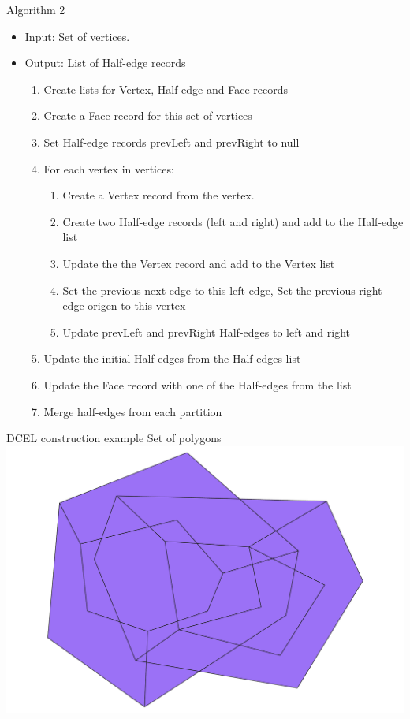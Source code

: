 \documentclass{beamer}
\begin{document}
\begin{frame}{Algorithm 2}
    \begin{itemize}
        \item Input: Set of vertices.
        \item Output: List of Half-edge records
        \begin{enumerate}
         \item Create lists for Vertex, Half-edge and Face records
         \item Create a Face record for this set of vertices
         \item Set Half-edge records prevLeft and prevRight to null 
         \item For each vertex in vertices:
            \begin{enumerate}
             \item Create a Vertex record from the vertex. 
             \item Create two Half-edge records (left and right) and add to the Half-edge list
             \item Update the the Vertex record and add to the Vertex list
             \item Set the previous next edge to this left edge, Set the previous right edge origen to this vertex
             \item Update prevLeft and prevRight Half-edges to left and right  
            \end{enumerate}
         \item Update the initial Half-edges from the Half-edges list
         \item Update the Face record with one of the Half-edges from the list
        \item Merge half-edges from each partition
        \end{enumerate}
    \end{itemize}
\end{frame}


\begin{frame}{DCEL construction example}
    \centering 
    Set of polygons \\
    \includegraphics[width=0.8\linewidth]{figures/DCEL01_input} 
\end{frame}
\end{document}
